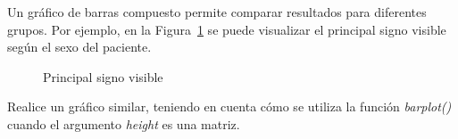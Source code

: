 \documentclass{prob}
\begin{document}
	\begin{problema}
	Un gráfico de barras compuesto permite comparar resultados para diferentes grupos. Por ejemplo, en la Figura~\ref{fig:plot03} se puede visualizar el principal signo visible según el sexo del paciente.
\begin{figure}[!ht]
    \centering
    
    \caption{Principal signo visible}
    \label{fig:plot03}
\end{figure}	

	Realice un gráfico similar, teniendo en cuenta cómo se utiliza la función \textit{barplot()} cuando el argumento \textit{height} es una matriz. 

	\end{problema}
\end{document}
